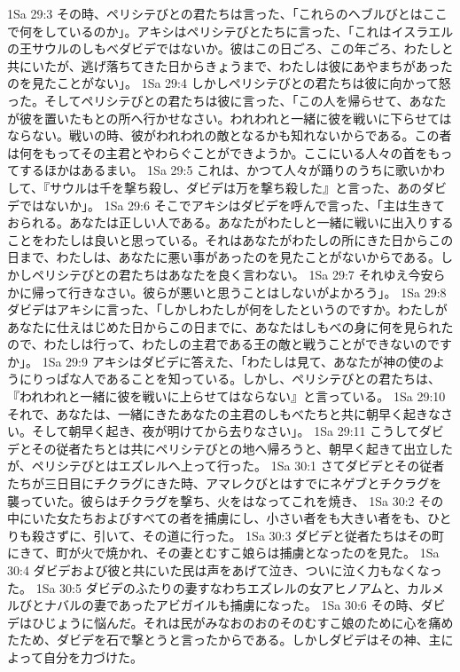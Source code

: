 1Sa 29:3  その時、ペリシテびとの君たちは言った、「これらのヘブルびとはここで何をしているのか」。アキシはペリシテびとたちに言った、「これはイスラエルの王サウルのしもべダビデではないか。彼はこの日ごろ、この年ごろ、わたしと共にいたが、逃げ落ちてきた日からきょうまで、わたしは彼にあやまちがあったのを見たことがない」。
1Sa 29:4  しかしペリシテびとの君たちは彼に向かって怒った。そしてペリシテびとの君たちは彼に言った、「この人を帰らせて、あなたが彼を置いたもとの所へ行かせなさい。われわれと一緒に彼を戦いに下らせてはならない。戦いの時、彼がわれわれの敵となるかも知れないからである。この者は何をもってその主君とやわらぐことができようか。ここにいる人々の首をもってするほかはあるまい。
1Sa 29:5  これは、かつて人々が踊りのうちに歌いかわして、『サウルは千を撃ち殺し、ダビデは万を撃ち殺した』と言った、あのダビデではないか」。
1Sa 29:6  そこでアキシはダビデを呼んで言った、「主は生きておられる。あなたは正しい人である。あなたがわたしと一緒に戦いに出入りすることをわたしは良いと思っている。それはあなたがわたしの所にきた日からこの日まで、わたしは、あなたに悪い事があったのを見たことがないからである。しかしペリシテびとの君たちはあなたを良く言わない。
1Sa 29:7  それゆえ今安らかに帰って行きなさい。彼らが悪いと思うことはしないがよかろう」。
1Sa 29:8  ダビデはアキシに言った、「しかしわたしが何をしたというのですか。わたしがあなたに仕えはじめた日からこの日までに、あなたはしもべの身に何を見られたので、わたしは行って、わたしの主君である王の敵と戦うことができないのですか」。
1Sa 29:9  アキシはダビデに答えた、「わたしは見て、あなたが神の使のようにりっぱな人であることを知っている。しかし、ペリシテびとの君たちは、『われわれと一緒に彼を戦いに上らせてはならない』と言っている。
1Sa 29:10  それで、あなたは、一緒にきたあなたの主君のしもべたちと共に朝早く起きなさい。そして朝早く起き、夜が明けてから去りなさい」。
1Sa 29:11  こうしてダビデとその従者たちとは共にペリシテびとの地へ帰ろうと、朝早く起きて出立したが、ペリシテびとはエズレルへ上って行った。
1Sa 30:1  さてダビデとその従者たちが三日目にチクラグにきた時、アマレクびとはすでにネゲブとチクラグを襲っていた。彼らはチクラグを撃ち、火をはなってこれを焼き、
1Sa 30:2  その中にいた女たちおよびすべての者を捕虜にし、小さい者をも大きい者をも、ひとりも殺さずに、引いて、その道に行った。
1Sa 30:3  ダビデと従者たちはその町にきて、町が火で焼かれ、その妻とむすこ娘らは捕虜となったのを見た。
1Sa 30:4  ダビデおよび彼と共にいた民は声をあげて泣き、ついに泣く力もなくなった。
1Sa 30:5  ダビデのふたりの妻すなわちエズレルの女アヒノアムと、カルメルびとナバルの妻であったアビガイルも捕虜になった。
1Sa 30:6  その時、ダビデはひじょうに悩んだ。それは民がみなおのおのそのむすこ娘のために心を痛めたため、ダビデを石で撃とうと言ったからである。しかしダビデはその神、主によって自分を力づけた。
